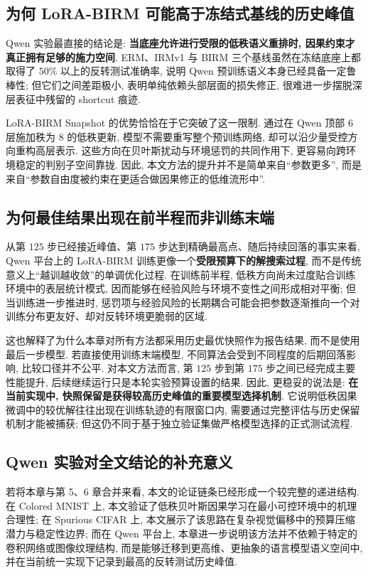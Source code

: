 \documentclass[a4paper,punct=banjiao,twoside]{ctexrep}
\theoremstyle{plain}
\theoremstyle{definition}
\theoremstyle{remark}
\begin{document}
\subsection{为何 LoRA-BIRM 可能高于冻结式基线的历史峰值}

Qwen 实验最直接的结论是: \textbf{当底座允许进行受限的低秩语义重排时, 因果约束才真正拥有足够的施力空间}. ERM、IRMv1 与 BIRM 三个基线虽然在冻结底座上都取得了 $50\%$ 以上的反转测试准确率, 说明 Qwen 预训练语义本身已经具备一定鲁棒性; 但它们之间差距极小, 表明单纯依赖头部层面的损失修正, 很难进一步摆脱深层表征中残留的 shortcut 痕迹.

LoRA-BIRM Snapshot 的优势恰恰在于它突破了这一限制. 通过在 Qwen 顶部 $6$ 层施加秩为 $8$ 的低秩更新, 模型不需要重写整个预训练网络, 却可以沿少量受控方向重构高层表示. 这些方向在贝叶斯扰动与环境惩罚的共同作用下, 更容易向跨环境稳定的判别子空间靠拢. 因此, 本文方法的提升并不是简单来自“参数更多”, 而是来自“参数自由度被约束在更适合做因果修正的低维流形中”.

\subsection{为何最佳结果出现在前半程而非训练末端}

从第 $125$ 步已经接近峰值、第 $175$ 步达到精确最高点、随后持续回落的事实来看, Qwen 平台上的 LoRA-BIRM 训练更像一个\textbf{受限预算下的解搜索过程}, 而不是传统意义上“越训越收敛”的单调优化过程. 在训练前半程, 低秩方向尚未过度贴合训练环境中的表层统计模式, 因而能够在经验风险与环境不变性之间形成相对平衡; 但当训练进一步推进时, 惩罚项与经验风险的长期耦合可能会把参数逐渐推向一个对训练分布更友好、却对反转环境更脆弱的区域.

这也解释了为什么本章对所有方法都采用历史最优快照作为报告结果, 而不是使用最后一步模型. 若直接使用训练末端模型, 不同算法会受到不同程度的后期回落影响, 比较口径并不公平. 对本文方法而言, 第 $125$ 步到第 $175$ 步之间已经完成主要性能提升, 后续继续运行只是本轮实验预算设置的结果. 因此, 更稳妥的说法是: \textbf{在当前实现中, 快照保留是获得较高历史峰值的重要模型选择机制}. 它说明低秩因果微调中的较优解往往出现在训练轨迹的有限窗口内, 需要通过完整评估与历史保留机制才能被捕获; 但这仍不同于基于独立验证集做严格模型选择的正式测试流程.

\subsection{Qwen 实验对全文结论的补充意义}

若将本章与第 5、6 章合并来看, 本文的论证链条已经形成一个较完整的递进结构. 在 Colored MNIST 上, 本文验证了低秩贝叶斯因果学习在最小可控环境中的机理合理性; 在 Spurious CIFAR 上, 本文展示了该思路在复杂视觉偏移中的预算压缩潜力与稳定性边界; 而在 Qwen 平台上, 本章进一步说明该方法并不依赖于特定的卷积网络或图像纹理结构, 而是能够迁移到更高维、更抽象的语言模型语义空间中, 并在当前统一实现下记录到最高的反转测试历史峰值.
\end{document}
